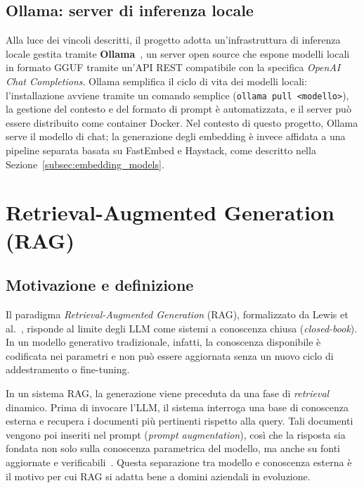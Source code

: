 \subsection{Ollama: server di inferenza locale}

Alla luce dei vincoli descritti, il progetto adotta un'infrastruttura di
inferenza locale gestita tramite
\textbf{Ollama}~\cite{ollama2023}, un server open source che espone modelli
locali in formato GGUF tramite un'API REST compatibile con la specifica
\textit{OpenAI Chat Completions}. Ollama semplifica il ciclo di vita dei modelli
locali: l'installazione avviene tramite un comando semplice (\texttt{ollama pull <modello>}),
la gestione del contesto e del formato di prompt è automatizzata, e il server
può essere distribuito come container Docker. Nel contesto di questo progetto,
Ollama serve il modello di chat; la generazione degli embedding è invece
affidata a una pipeline separata basata su FastEmbed e Haystack, come descritto
nella Sezione~\ref{subsec:embedding_models}.

\section{Retrieval-Augmented Generation (RAG)}
\label{sec:rag}

\subsection{Motivazione e definizione}

Il paradigma \textit{Retrieval-Augmented Generation} (RAG), formalizzato da
Lewis et al.~\cite{lewis2020retrieval}, risponde al limite degli LLM come
sistemi a conoscenza chiusa (\textit{closed-book}). In un modello generativo
tradizionale, infatti, la conoscenza disponibile è codificata nei parametri e
non può essere aggiornata senza un nuovo ciclo di addestramento o fine-tuning.

In un sistema RAG, la generazione viene preceduta da una fase di
\textit{retrieval} dinamico. Prima di invocare l'LLM, il sistema interroga una
base di conoscenza esterna e recupera i documenti più pertinenti rispetto alla
query. Tali documenti vengono poi inseriti nel prompt
(\textit{prompt augmentation}), così che la risposta sia fondata non solo sulla
conoscenza parametrica del modello, ma anche su fonti aggiornate e
verificabili~\cite{shuster2021retrieval}. Questa separazione tra modello e
conoscenza esterna è il motivo per cui RAG si adatta bene a domini aziendali in
evoluzione.

